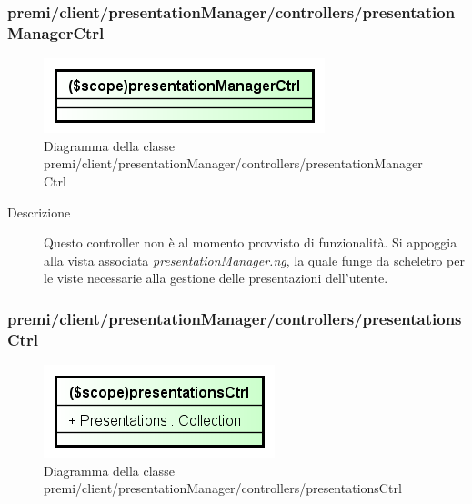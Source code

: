 \subsubsection{premi/client/presentationManager/controllers/presentationManagerCtrl}
\begin{figure}[h]
\begin{center}
\includegraphics[scale=0.90]{img/diacla/presentationManagerCtrl.png}
\caption{Diagramma della classe premi/client/presentationManager/controllers/presentationManagerCtrl}
\end{center}
\end{figure}

\begin{description}
\item[Descrizione] \hfill
	Questo controller non è al momento provvisto di funzionalità. Si appoggia alla vista associata \textit{presentationManager.ng}, la quale funge da scheletro per le viste necessarie alla gestione delle presentazioni dell'utente.
\end{description}




\subsubsection{premi/client/presentationManager/controllers/presentationsCtrl}
\begin{figure}[h]
\begin{center}
\includegraphics[scale=0.90]{img/diacla/presentationsCtrl.png}
\caption{Diagramma della classe premi/client/presentationManager/controllers/presentationsCtrl}
\end{center}
\end{figure}

